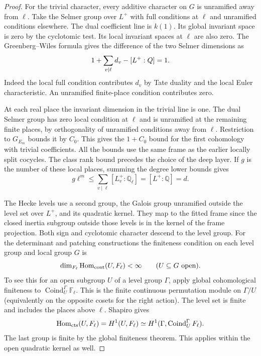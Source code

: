 \begin{proof}
For the trivial character, every additive character on
\(G\) is unramified away from \(\ell\). Take the Selmer group
over \(L^+\) with full conditions at \(\ell\) and unramified
conditions elsewhere. The dual coefficient line is
\(k(1)\). Its global invariant space is zero by the
cyclotomic test. Its local invariant spaces at \(\ell\) are
also zero. The Greenberg--Wiles formula gives the difference
of the two Selmer dimensions as
\[
           1+\sum_{v\mid\ell} d_v-[L^+:\Q]=1 .
\]
Indeed the local full condition contributes \(d_v\) by
Tate duality and the local Euler characteristic. An
unramified finite-place condition contributes zero.

At each real place the invariant dimension in the trivial
line is one. The dual Selmer group has zero local condition
at \(\ell\) and is unramified at the remaining finite
places, by orthogonality of unramified conditions away
from \(\ell\). Restriction to \(G_{E_m}\) bounds it by
\(C_0\). This gives the \(1+C_0\) bound for the first
cohomology with trivial coefficients. All the bounds use
the same frame as the earlier locally split cocycles.
The class rank bound precedes the choice of the deep
layer. If \(g\) is the number of these local places, summing the degree lower bounds gives
\[
 g\ell^m\le\sum_{v\mid\ell}[L^+_v:\mathbb Q_\ell]=[L^+:\mathbb Q]=d .
\]
\cite{ferrero-washington,washington-cyclo,milne-duality}

The Hecke levels use a second group, the Galois group
unramified outside the level set over \(L^+\), and its
quadratic kernel. They map to the fitted frame since the
closed inertia subgroup outside those levels is in the
kernel of the frame projection. Both sign and cyclotomic
character descend to the level group. For the determinant and patching constructions the finiteness condition on each level group and local group \(G\) is 
\[
 \dim_{\mathbb F_\ell}\operatorname{Hom}_{\rm cont}(U,\mathbb F_\ell)<\infty\qquad(U\subseteq G\text{ open}).
\]
 To see this for an open subgroup \(U\)
of a level group \(\Gamma\), apply global cohomological
finiteness to
\(\operatorname{Coind}_{U}^{\Gamma}\mathbb F_\ell\).
This is the finite continuous permutation module on
\(\Gamma/U\) (equivalently on the opposite cosets for the
right action). The level set is finite and includes the places
above \(\ell\). Shapiro gives
\[
 \operatorname{Hom}_{\rm cts}(U,\mathbb F_\ell)
   =H^1(U,\mathbb F_\ell)
   \simeq H^1(\Gamma,\operatorname{Coind}_{U}^{\Gamma}
                                    \mathbb F_\ell).
\]
The last group is finite by the global finiteness theorem.
This applies within the open quadratic kernel as well.


\end{proof}
